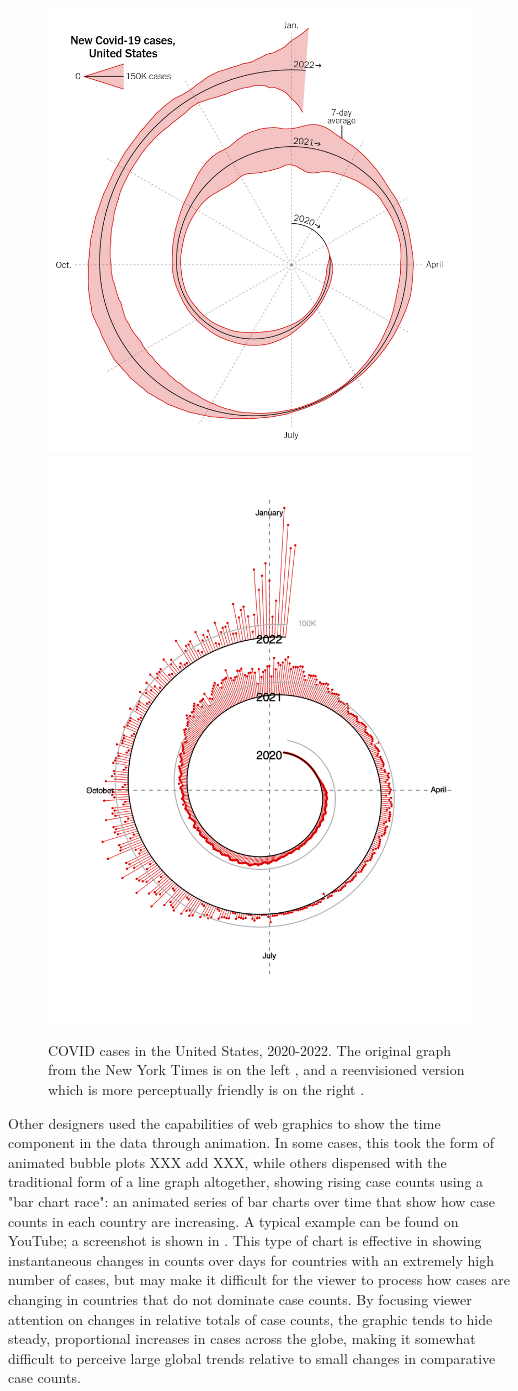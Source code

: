 \documentclass[article]{jdssv}\usepackage[]{graphicx}\usepackage[]{xcolor}
\begin{document}
\begin{figure}\centering
\includegraphics[width=.45\linewidth]{nyt-spiral}\hfill\includegraphics[width=.45\linewidth]{spiral-rework}
\caption{COVID cases in the United States, 2020-2022. The original graph from the New York Times is on the left \citep{shamanOpinionHereWhen2022}, and a reenvisioned version which is more perceptually friendly is on the right \citep{shresthaCovidSpiral2022}.}
\label{fig:nyt-spiral}
\end{figure}

Other designers used the capabilities of web graphics to show the time component in the data through animation. In some cases, this took the form of animated bubble plots XXX add XXX, while others dispensed with the traditional form of a line graph altogether, showing rising case counts using a "bar chart race": an animated series of bar charts over time that show how case counts in each country are increasing. A typical example can be found on YouTube\citep{clockCoronavirusCasesBar2022}; a screenshot is shown in . This type of chart is effective in showing instantaneous changes in counts over days for countries with an extremely high number of cases, but may make it difficult for the viewer to process how cases are changing in countries that do not dominate case counts. By focusing viewer attention on changes in relative totals of case counts, the graphic tends to hide steady, proportional increases in cases across the globe, making it somewhat difficult to perceive large global trends relative to small changes in comparative case counts. 
\end{document}
